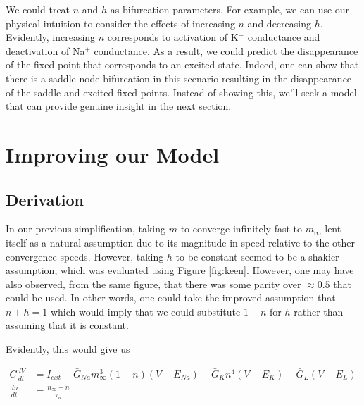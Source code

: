 \documentclass{article}
\begin{document}
We could treat $n$ and $h$ as bifurcation parameters. For example, we can use our physical intuition to consider the effects of increasing $n$ and decreasing $h$. Evidently, increasing $n$ corresponds to activation of K$^+$ conductance and deactivation of Na$^+$ conductance. As a result, we could predict the disappearance of the fixed point that corresponds to an excited state. Indeed, one can show that there is a saddle node bifurcation in this scenario resulting in the disappearance of the saddle and excited fixed points.\cite{keener} Instead of showing this, we'll seek a model that can provide genuine insight in the next section.




\section{Improving our Model}

\subsection{Derivation}

In our previous simplification, taking $m$ to converge infinitely fast to $m_\infty$ lent itself as a natural assumption due to its magnitude in speed relative to the other convergence speeds. However, taking $h$ to be constant seemed to be a shakier assumption, which was evaluated using Figure \ref{fig:keen}. However, one may have also observed, from the same figure, that there was some parity over $\approx 0.5$ that could be used. In other words, one could take the improved assumption that $n + h = 1$ which would imply that we could substitute $1 - n$ for $h$ rather than assuming that it is constant.

Evidently, this would give us

\begin{align*}
        C\frac{dV}{dt} &= I_{ext}-\bar{G}_{Na}m_\infty^3(1-n)(V-E_{Na}) -\bar{G}_{K}n^4(V-E_{K})  -\bar{G}_{L}(V-E_{L}) \\
    \frac{dn}{dt} &= \frac{n_{\infty}-n}{\tau_n} 
\end{align*}
\end{document}
